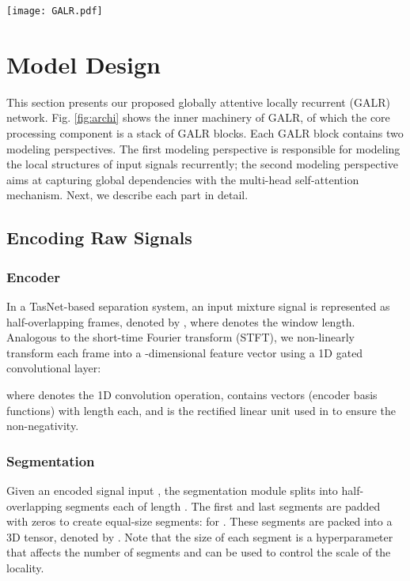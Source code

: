 \documentclass{article}
\begin{document}
\begin{figure*}[ht!]
\vspace{-0.1cm}
 \centering
    \texttt{[image: GALR.pdf]}
\caption{Left: the overall architecture of our GALR network. Right: detailed illustration about how the intra- and inter-segment sequences are processed in the locally recurrent layer (lower right) and the globally attentive layer (upper right) inside each GALR block, respectively.}
\vspace{-0.3cm}
\label{fig:archi}
\end{figure*}


\section{Model Design}
\label{sec:2}
This section presents our proposed globally attentive locally recurrent (GALR) network. Fig. \ref{fig:archi} shows the inner machinery of GALR, of which the core processing component is a stack of GALR blocks. Each GALR block contains two modeling perspectives. The first modeling perspective is responsible for modeling the local structures of input signals recurrently; the second modeling perspective aims at capturing global dependencies with the multi-head self-attention mechanism. Next, we describe each part in detail.

\subsection{Encoding Raw Signals}

\subsubsection{Encoder}
In a TasNet-based separation system, an input mixture signal is represented as  half-overlapping frames, denoted by , where  denotes the window length. Analogous to the short-time Fourier transform (STFT), we non-linearly transform each frame  into a -dimensional feature vector  using a 1D gated convolutional layer:

where  denotes the 1D convolution operation,  contains  vectors (encoder basis functions) with length  each, and  is the rectified linear unit used in \cite{luo2018tasnet, luo2019dual, luo2019conv} to ensure the non-negativity.

\subsubsection{Segmentation}
Given an encoded signal input , the segmentation module splits  into  half-overlapping segments each of length . The first and last segments are padded with zeros to create  equal-size segments:  for . These segments are packed into a 3D tensor, denoted by . Note that the size of each segment  is a hyperparameter that affects the number of segments and can be used to control the scale of the locality.
\end{document}
